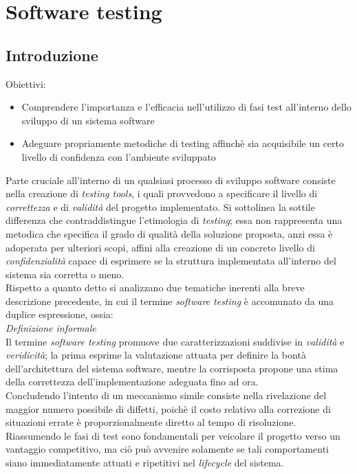 \documentclass{article}
\begin{document}
\pagestyle{empty}
\section*{Software testing}
\large

\subsection*{Introduzione}
\large
Obiettivi:
\begin{itemize}
    \renewcommand{\labelitemi}{-}
    \itemsep0em
    \item Comprendere l'importanza e l'efficacia nell'utilizzo di fasi test all'interno dello sviluppo di un sistema software
    \item Adeguare propriamente metodiche di testing affinchè sia acquisibile un certo livello di confidenza con l'ambiente sviluppato
\end{itemize}
Parte cruciale all'interno di un qualsiasi processo di sviluppo software consiste nella creazione di \textit{testing tools}, i quali provvedono a specificare il livello di \textit{correttezza} e di \textit{validità} del progetto implementato. Si sottolinea la sottile differenza che contraddistingue l'etimologia di \textit{testing}; essa non rappresenta una metodica che specifica il grado di qualità della soluzione proposta, anzi essa è adoperata per ulteriori scopi, affini alla creazione di un concreto livello di \textit{confidenzialità} capace di esprimere se la struttura implementata all'interno del sistema sia corretta o meno.\vspace*{14pt}\\
Rispetto a quanto detto si analizzano due tematiche inerenti alla breve descrizione precedente, in cui il termine \textit{software testing} è accomunato da una duplice espressione, ossia:\vspace*{14pt}\\
\textit{Definizione informale}\\
Il termine \textit{software testing} promuove due caratterizzazioni suddivise in \textit{validità} e \textit{veridicità}; la prima esprime la valutazione attuata per definire la bontà dell'architettura del sistema software, mentre la corrisposta propone una stima della correttezza dell'implementazione adeguata fino ad ora.\vspace*{14pt}\\
Concludendo l'intento di un meccanismo simile consiste nella rivelazione del maggior numero possibile di diffetti, poichè il costo relativo alla correzione di situazioni errate è proporzionalmente diretto al tempo di risoluzione. Riassumendo le fasi di test sono fondamentali per veicolare il progetto verso un vantaggio competitivo, ma ciò può avvenire solamente se tali comportamenti siano immediatamente attuati e ripetitivi nel \textit{lifecycle} del sistema.  
\end{document}
